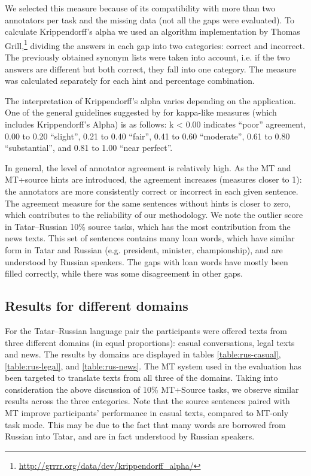\documentclass[11pt]{article}
\newcommand{\comment}[1]{}
\begin{document}
We selected this measure because of its compatibility with more than two annotators per task and the missing data (not all the gaps were evaluated). To calculate Krippendorff's alpha we used an algorithm implementation by Thomas Grill,\footnote{\url{http://grrrr.org/data/dev/krippendorff_alpha/}} dividing the answers in each gap into two categories: correct and incorrect. The previously obtained synonym lists were taken into account, i.e. if the two answers are different but both correct, they fall into one category. The measure was calculated separately for each hint and percentage combination.

The interpretation of Krippendorff's alpha varies depending on the application. One of the general guidelines suggested by \citet{landis77} for kappa-like measures (which includes Krippendorff's Alpha) is as follows: k < 0.00 indicates ``poor'' agreement, 0.00 to 0.20 ``slight'', 0.21 to 0.40 ``fair'', 0.41 to 0.60 ``moderate'', 0.61 to 0.80 ``substantial'', and 0.81 to 1.00 ``near perfect''.

In general, the level of annotator agreement is relatively high. As the MT and MT+source hints are introduced, the agreement increases (measures closer to 1): the annotators are more consistently correct or incorrect in each given sentence. The agreement measure for the same sentences without hints is closer to zero, which contributes to the reliability of our methodology. We note the outlier score in Tatar--Russian 10\% source tasks, which has the most contribution from the news texts. \comment{EA: this Alpha is from a table we do not report here, I added a couple of words to clarify}This set of sentences contains many loan words, which have similar form in Tatar and Russian (e.g. president, minister, championship), and are understood by Russian speakers. The gaps with loan words have mostly been filled correctly, while there was some disagreement in other gaps.

\subsection{Results for different domains}
For the Tatar--Russian language pair the participants were offered texts from three different domains (in equal proportions): casual conversations, legal texts and news. The results by domains are displayed in tables \ref{table:rus-casual}, \ref{table:rus-legal}, and \ref{table:rus-news}. The MT system used in the evaluation has been targeted to translate texts from all three of the domains. Taking into consideration the above discussion of 10\% MT+Source tasks, we observe similar results across the three categories. Note that the source sentences paired with MT improve participants' performance in casual texts, compared to MT-only task mode. This may be due to the fact that many words are borrowed from Russian into Tatar, and are in fact understood by Russian speakers.
\end{document}
